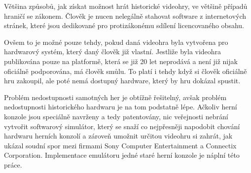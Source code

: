 Většina způsobů, jak získat možnost hrát historické videohry, ve většině případů hraničí
se zákonem. Člověk je nucen nelegálně stahovat software z internetových stránek,
které jsou dedikované pro protizákonému sdílení licencovaného obsahu.

Ovšem to je možné pouze tehdy, pokud daná videohra byla vytvořena pro hardwarový systém,
který daný člověk již vlastní. Jestliže byla videohra publikována pouze na platformě,
která se již 20 let neprodává a není již nijak oficiálně podporována, má člověk smůlu.
To platí i tehdy když si člověk oficiálně hru zakoupil, ale poté nemá dostupný hardware, který by hru
dokázal spustit.

Problém nedostupnosti samotných her je obtížně řešitelný, avšak problém nedostupnosti
historického hardwaru je na tom podstatně lépe. Ačkoliv herní konzole jsou
speciálně navrženy a tedy patentovány, nic veřejnosti nebrání vytvořit softwarový simulátor,
který se snaží co nejpřesněji napodobit chování hardwaru herních konzolí a
zároveň umožnit určitou videohru si zahrát, jak ukázal soudní spor mezi
firmami Sony Computer Entertainment a Connectix Corporation\cite{SonyVsConnectix}.
Implementace emulátoru jedné staré herní konzole je náplní této práce.
